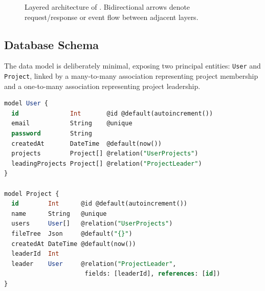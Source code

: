 \begin{figure}[H]
  \centering
  \caption{Layered architecture of \echoray. Bidirectional arrows denote
    request/response or event flow between adjacent layers.}
  \label{fig:arch_layers}
\end{figure}

\subsection{Database Schema}

The data model is deliberately minimal, exposing two principal entities:
\texttt{User} and \texttt{Project}, linked by a many-to-many association
representing project membership and a one-to-many association representing
project leadership.

\begin{lstlisting}[language=SQL,caption={Prisma schema (\texttt{schema.prisma}). The
  \texttt{fileTree} column stores the entire project file structure as a
  JSON blob, enabling schema-free project content evolution.},
  label=lst:schema]
model User {
  id              Int       @id @default(autoincrement())
  email           String    @unique
  password        String
  createdAt       DateTime  @default(now())
  projects        Project[] @relation("UserProjects")
  leadingProjects Project[] @relation("ProjectLeader")
}

model Project {
  id        Int      @id @default(autoincrement())
  name      String   @unique
  users     User[]   @relation("UserProjects")
  fileTree  Json     @default("{}")
  createdAt DateTime @default(now())
  leaderId  Int
  leader    User     @relation("ProjectLeader",
                      fields: [leaderId], references: [id])
}
\end{lstlisting}

